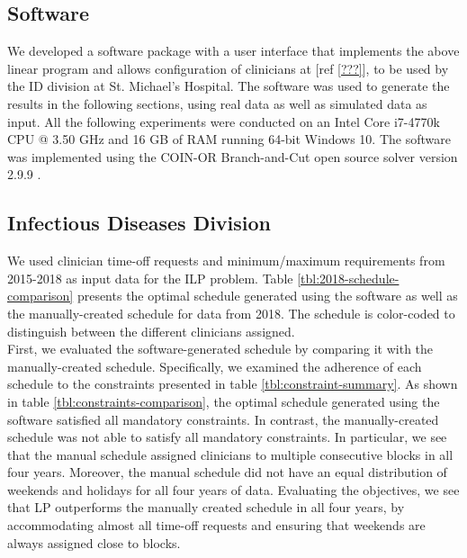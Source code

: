 \subsection{Software}
We developed a software package with a user interface that implements the above linear program and allows configuration of clinicians at [ref \ref{???}], to be used by the ID division at St. Michael's Hospital. The software was used to generate the results in the following sections, using real data as well as simulated data as input. All the following experiments were conducted on an Intel Core i7-4770k CPU @ 3.50 GHz and 16 GB of RAM running 64-bit Windows 10. The software was implemented using the COIN-OR Branch-and-Cut open source solver version 2.9.9 \cite{johnjforrest_coin-or/cbc:_2019}.

\subsection{Infectious Diseases Division}  %
We used clinician time-off requests and minimum/maximum requirements from 2015-2018 as input data for the ILP problem. Table \ref{tbl:2018-schedule-comparison} presents the optimal schedule generated using the software as well as the manually-created schedule for data from 2018. The schedule is color-coded to distinguish between the different clinicians assigned. \\



First, we evaluated the software-generated schedule by comparing it with the manually-created schedule. Specifically, we examined the adherence of each schedule to the constraints presented in table \ref{tbl:constraint-summary}. As shown in table \ref{tbl:constraints-comparison}, the optimal schedule generated using the software satisfied all mandatory constraints. In contrast, the manually-created schedule was not able to satisfy all mandatory constraints. In particular, we see that the manual schedule assigned clinicians to multiple consecutive blocks in all four years. Moreover, the manual schedule did not have an equal distribution of weekends and holidays for all four years of data. Evaluating the objectives, we see that LP outperforms the manually created schedule in all four years, by accommodating almost all time-off requests and ensuring that weekends are always assigned close to blocks. \\

